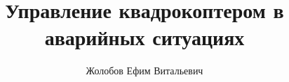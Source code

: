 \documentclass[aspectratio=169, xcolor={svgnames}]{beamer}
\title{Управление квадрокоптером в аварийных ситуациях}
\author{Жолобов Ефим Витальевич}
\institute{СПбГУ 2021}
\begin{document}
\begin{frame}
\titlepage
\end{frame}



%
\end{document}
